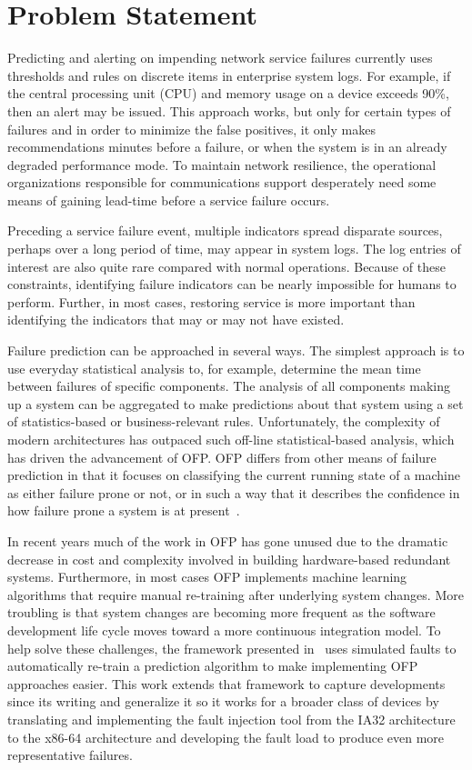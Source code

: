 \section{Problem Statement}
Predicting and alerting on impending network service failures currently uses
thresholds and rules on discrete items in enterprise system logs.  For example,
if the central processing unit (CPU) and memory usage on a device exceeds 90\%,
then an alert may be issued.  This approach works, but only for certain types
of failures and in order to minimize the false positives, it only makes
recommendations minutes before a failure, or when the system is in an already
degraded performance mode.  To maintain network resilience, the operational
organizations responsible for communications support desperately need some
means of gaining lead-time before a service failure occurs.  

Preceding a service failure event, multiple indicators spread disparate
sources, perhaps over a long period of time, may appear in system logs.  The
log entries of interest are also quite rare compared with normal operations.
Because of these constraints, identifying failure indicators can be nearly
impossible for humans to perform.  Further, in most cases, restoring service is
more important than identifying the indicators that may or may not have
existed.  

Failure prediction can be approached in several ways. The simplest approach is
to use everyday statistical analysis to, for example, determine the mean time
between failures of specific components. The analysis of all components making
up a system can be aggregated to make predictions about that system using a set
of statistics-based or business-relevant rules.  Unfortunately, the complexity
of modern architectures has outpaced such off-line statistical-based analysis,
which has driven the advancement of OFP.  OFP differs from other means of
failure prediction in that it focuses on classifying the current running state
of a machine as either failure prone or not, or in such a way that it describes
the confidence in how failure prone a system is at
present~\cite{salfnerSurvey}.

In recent years much of the work in OFP has gone unused due to the dramatic
decrease in cost and complexity involved in building hardware-based redundant
systems.  Furthermore, in most cases OFP implements machine learning algorithms
that require manual re-training after underlying system changes.  More
troubling is that system changes are becoming more frequent as the software
development life cycle moves toward a more continuous integration model.  To
help solve these challenges, the framework presented in~\cite{irrera2015} uses
simulated faults to automatically re-train a prediction algorithm to make
implementing OFP approaches easier.  This work extends that framework to
capture developments since its writing and generalize it so it works for a
broader class of devices by translating and implementing the fault injection
tool from the IA32 architecture to the x86-64 architecture and developing the
fault load to produce even more representative failures.

